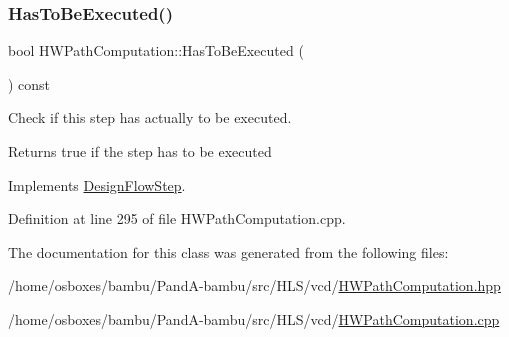 \mbox{\label{classHWPathComputation_a0a9a812ed694880508c509a63c03fb26}} 
\subsubsection{\texorpdfstring{Has\+To\+Be\+Executed()}{HasToBeExecuted()}}
{\footnotesize\ttfamily bool H\+W\+Path\+Computation\+::\+Has\+To\+Be\+Executed (\begin{DoxyParamCaption}{ }\end{DoxyParamCaption}) const\hspace{0.3cm}{\ttfamily [virtual]}}



Check if this step has actually to be executed. 

\begin{DoxyReturn}{Returns}
true if the step has to be executed 
\end{DoxyReturn}


Implements \hyperlink{classDesignFlowStep_a1783abe0c1d162a52da1e413d5d1ef05}{Design\+Flow\+Step}.



Definition at line 295 of file H\+W\+Path\+Computation.\+cpp.



The documentation for this class was generated from the following files\+:\begin{DoxyCompactItemize}
\item 
/home/osboxes/bambu/\+Pand\+A-\/bambu/src/\+H\+L\+S/vcd/\hyperlink{HWPathComputation_8hpp}{H\+W\+Path\+Computation.\+hpp}\item 
/home/osboxes/bambu/\+Pand\+A-\/bambu/src/\+H\+L\+S/vcd/\hyperlink{HWPathComputation_8cpp}{H\+W\+Path\+Computation.\+cpp}\end{DoxyCompactItemize}
